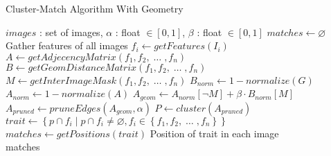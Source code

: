 \documentclass{article}
\begin{document}
\begin{algorithm}
\caption{Cluster-Match Algorithm With Geometry}
\label{alg-geometry}
\begin{algorithmic}
\Require $images$ : set of images, $\alpha$ : float $\in \left[0, 
1\right]$, $\beta$ : float $\in \left[0, 1\right]$
\State $matches\gets \varnothing$
 \Comment Gather features of all images
	\State $f_i\gets getFeatures(I_i)$
\EndFor
\State $A\gets getAdjecencyMatrix(f_1, f_2,\; \ldots \;, f_n)$
\State $B\gets getGeomDistanceMatrix(f_1, f_2,\; \ldots \;, f_n)$
\State $M\gets getInterImageMask(f_1, f_2,\; \ldots \;, f_n)$
\State $B_{norm}\gets 1 - normalize(G)$ \State $A_{norm}\gets 1 - 
normalize(A)$
\State $A_{geom}\gets A_{norm}\left[ \neg M\right] + \beta \cdot 
B_{norm}\left[M\right]$
\State $A_{pruned}\gets pruneEdges(A_{geom},\alpha)$
\State $P\gets cluster(A_{pruned})$ 
	\State $trait\gets \left\{p \cap f_i \mid p \cap f_i \neq 
\varnothing, f_i \in \left\{f_1, f_2,\; \ldots \;, f_n\right\}\right\}$
		\State $matches\gets getPositions(trait)$
		\Comment Position of trait in each image
	\EndIf
\EndFor \\
\Return matches
\end{algorithmic}
\end{algorithm}
\end{document}
